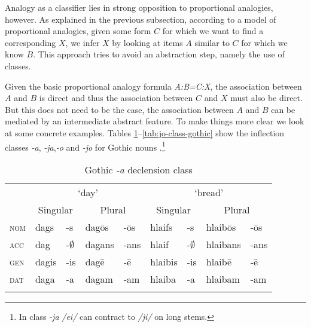 Analogy as a classifier lies in strong opposition to proportional analogies, however. As explained in the previous subsection, according to a model of proportional analogies, given some form $C$ for which we want to find a corresponding $X$, we infer $X$ by looking at items $A$ similar to $C$ for which we know $B$. This approach tries to avoid an abstraction step, namely the use of classes.
 
Given the basic proportional analogy formula \textit{A:B=C:X}, the association between $A$ and $B$ is direct and thus the association between $C$ and $X$ must also be direct. But this does not need to be the case, the association between $A$ and $B$ can be mediated by an intermediate abstract feature. To make things more clear we look at some concrete examples. Tables \ref{tab:a-class-gothic}--\ref{tab:jo-class-gothic} show the inflection classes \textit{-a}, \textit{-ja},\textit{-o} and \textit{-jo} for Gothic nouns \autocite{Braune.1895}.\footnote{In class \textit{-ja} \textit{/ei/} can contract to \textit{/ji/} on long stems.}
   


\begin{table}[h]
    \centering
    \caption{Gothic \textit{-a} declension class}\label{tab:a-class-gothic}
    \begin{tabular}{lllllllll}
      \lsptoprule
      & \multicolumn{4}{c}{`day'} & \multicolumn{4}{c}{`bread'}\\
      & \multicolumn{2}{c}{Singular} & \multicolumn{2}{c}{Plural} & \multicolumn{2}{c}{Singular} & \multicolumn{2}{c}{Plural} \\
      \midrule

      \textsc{nom} & dags  & -s           & dagōs  & -ōs  & hlaifs  & -s           & hlaibōs  & -ōs  \\
      \textsc{acc} & dag   & -$\emptyset$ & dagans & -ans & hlaif   & -$\emptyset$ & hlaibans & -ans \\
      \textsc{gen} & dagis & -is          & dagē   & -ē   & hlaibis & -is          & hlaibē   & -ē   \\
      \textsc{dat} & daga  & -a           & dagam  & -am  & hlaiba  & -a           & hlaibam  & -am  \\
      \lspbottomrule
  \end{tabular}
\end{table}

